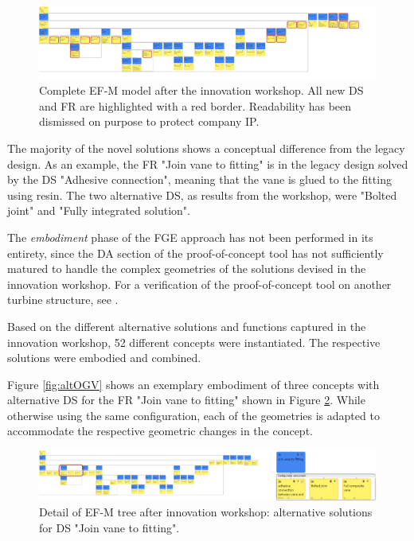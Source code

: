 \documentclass[preprints,article,accept,moreauthors,pdftex]{Definitions/mdpi}
\begin{document}
\begin{figure}[ht]
    \centering
    \includegraphics[width=\textwidth]{figures/fullEFM.png}
    \caption{Complete EF-M model after the innovation workshop.
    All new DS and FR are highlighted with a red border.
    Readability has been dismissed on purpose to protect company IP.}
    \label{fig:fullEFM}
\end{figure}

The majority of the novel solutions shows a conceptual difference from the legacy design.
As an example, the \ac{FR} "Join vane to fitting" is in the legacy design solved by the \ac{DS} "Adhesive connection", meaning that the vane is glued to the fitting using resin.
The two alternative \ac{DS}, as results from the workshop, were "Bolted joint" and "Fully integrated solution".


The \textit{embodiment} phase of the \ac{FGE} approach has not been performed in its entirety, since the \ac{DA} section of the proof-of-concept tool has not sufficiently matured to handle the complex geometries of the solutions devised in the innovation workshop. For a verification of the proof-of-concept tool on another turbine structure, see \citep{Muller2021FunctionVariants}.

Based on the different alternative solutions and functions captured in the innovation workshop, 52 different concepts were instantiated.
The respective solutions were embodied and combined.

Figure \ref{fig:altOGV} shows an exemplary embodiment of three concepts with alternative DS for the FR "Join vane to fitting" shown in Figure \ref{fig:efmAltFoot}.
While otherwise using the same configuration, each of the geometries is adapted to accommodate the respective geometric changes in the concept.

\begin{figure}[ht]
    \centering
    \includegraphics[width=\textwidth]{figures/efmHighlightFoot.png}
    \caption{Detail of EF-M tree after innovation workshop: alternative solutions for DS "Join vane to fitting".}
    \label{fig:efmAltFoot}
\end{figure}
\end{document}
